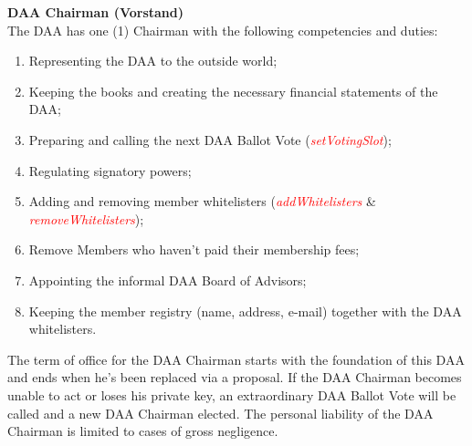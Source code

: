 \item \textbf{DAA Chairman (Vorstand)} \\
The DAA has one (1) Chairman with the following competencies and duties:
\begin{enumerate}
    [label=(\alph*)]
    \item Representing the DAA to the outside world;
    \item Keeping the books and creating the necessary financial statements of the DAA;
    \item Preparing and calling the next DAA Ballot Vote (\textcolor{red}{\emph{setVotingSlot}});
    \item Regulating signatory powers;
    \item Adding and removing member whitelisters (\textcolor{red}{\emph{addWhitelisters}} \& \textcolor{red}{\emph{removeWhitelisters}});
    \item Remove Members who haven't paid their membership fees;
    \item Appointing the informal DAA Board of Advisors; %
    \item Keeping the member registry (name, address, e-mail) together with the DAA whitelisters. %
\end{enumerate}
The term of office for the DAA Chairman starts with the foundation of this DAA and ends when he's been replaced via a proposal.
If the DAA Chairman becomes unable to act or loses his private key, an extraordinary DAA Ballot Vote will be called and a new DAA Chairman elected.
The personal liability of the DAA Chairman is limited to cases of gross negligence.

